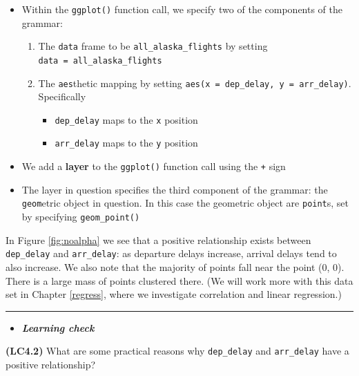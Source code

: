 \documentclass[]{tufte-book}
\let\oldrule=\rule
\renewcommand{\rule}[1]{\oldrule{\linewidth}}
\providecommand{\tightlist}{%
  \setlength{\itemsep}{0pt}\setlength{\parskip}{0pt}}
\newenvironment{rmdblock}[1]
  {\begin{shaded*}
  \begin{itemize}
  \renewcommand{\labelitemi}{
    \raisebox{-.7\height}[0pt][0pt]{
    }
  }
  \item
  }
  {
  \end{itemize}
  \end{shaded*}
  }
\newenvironment{learncheck}
  {\begin{rmdblock}{warning}}
  {\end{rmdblock}}
\theoremstyle{definition}
\theoremstyle{definition}
\theoremstyle{remark}
\begin{document}
\begin{itemize}
\tightlist
\item
  Within the \texttt{ggplot()} function call, we specify two of the
  components of the grammar:

  \begin{enumerate}
  \def\labelenumi{\arabic{enumi}.}
  \tightlist
  \item
    The \texttt{data} frame to be \texttt{all\_alaska\_flights} by
    setting \texttt{data\ =\ all\_alaska\_flights}
  \item
    The \texttt{aes}thetic mapping by setting
    \texttt{aes(x\ =\ dep\_delay,\ y\ =\ arr\_delay)}. Specifically

    \begin{itemize}
    \tightlist
    \item
      \texttt{dep\_delay} maps to the \texttt{x} position
    \item
      \texttt{arr\_delay} maps to the \texttt{y} position
    \end{itemize}
  \end{enumerate}
\item
  We add a \textbf{layer} to the \texttt{ggplot()} function call using
  the \texttt{+} sign
\item
  The layer in question specifies the third component of the grammar:
  the \texttt{geom}etric object in question. In this case the geometric
  object are \texttt{point}s, set by specifying \texttt{geom\_point()}
\end{itemize}

In Figure \ref{fig:noalpha} we see that a positive relationship exists
between \texttt{dep\_delay} and \texttt{arr\_delay}: as departure delays
increase, arrival delays tend to also increase. We also note that the
majority of points fall near the point (0, 0). There is a large mass of
points clustered there. (We will work more with this data set in Chapter
\ref{regress}, where we investigate correlation and linear regression.)

\begin{center}\rule{0.5\linewidth}{\linethickness}\end{center}

\begin{learncheck}
\textbf{\emph{Learning check}}
\end{learncheck}

\textbf{(LC4.2)} What are some practical reasons why \texttt{dep\_delay}
and \texttt{arr\_delay} have a positive relationship?
\end{document}
